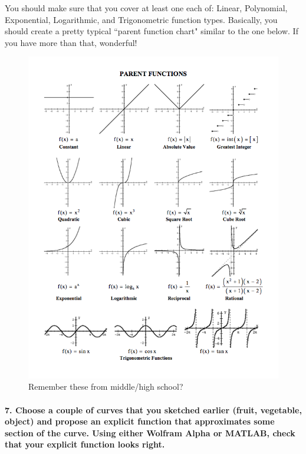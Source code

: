 \documentclass{article}
\begin{document}
You should make sure that you cover at least one each of: Linear, Polynomial, Exponential, Logarithmic, and Trigonometric function types. Basically, you should create a pretty typical ``parent function chart" similar to the one below. If you have more than that, wonderful!

\begin{figure} [h!]
    \centering
    \includegraphics[width=1\columnwidth]{figs_and_code/parentfunctions.png}
    \caption{Remember these from middle/high school?}
\end{figure}

\vspace{5cm}

\paragraph{7. Choose a couple of curves that you sketched earlier (fruit, vegetable, object) and propose an explicit function that approximates some section of the curve. Using either Wolfram Alpha or MATLAB, check that your explicit function looks right.} 
\end{document}
